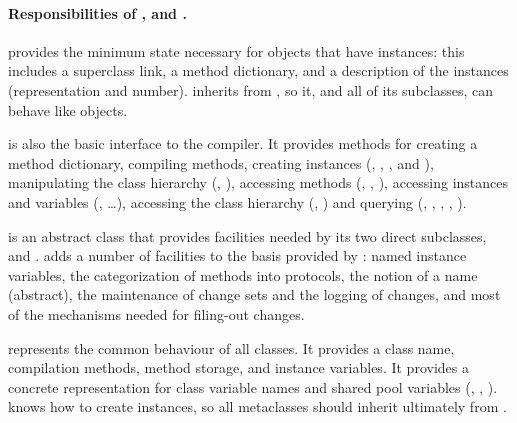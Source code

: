 \documentclass[a4paper,10pt,twoside]{book}
\begin{document}

\paragraph{Responsibilities of ,  and .}
 provides the minimum state necessary for objects that have instances: this includes a superclass link, a method dictionary, and a description of the instances (\ie representation and number).
 inherits from , so it, and all of its subclasses, can behave like objects. 

 is also the basic interface to the compiler.
It provides methods for creating a method dictionary,
compiling methods,
creating instances (\ie {}, , , and ),
manipulating the class hierarchy (\ie {}, ),
accessing methods (\ie {}, , ),
accessing instances and variables (\ie {}, \ldots),
accessing the class hierarchy (\ie {}, )
and querying (\ie {}, , , , ).


 is an abstract class that provides facilities needed by its two direct subclasses,  and .
 adds a number of facilities to the basis provided by :
named instance variables,
the categorization of methods into protocols,
the notion of a name (abstract),
the maintenance of change sets and the logging of changes, and
most of the mechanisms needed for filing-out changes.

 represents the common behaviour of all classes.
It provides a class name, compilation methods, method storage, and instance variables.
It provides a concrete representation for class variable names and shared pool variables (, , ).
 knows how to create instances, so all metaclasses should inherit ultimately from .
\end{document}

